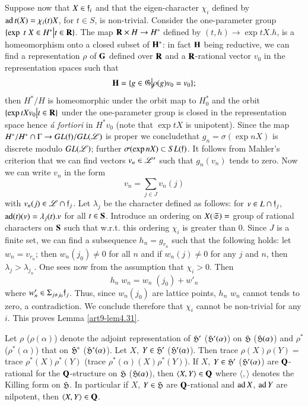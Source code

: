 \subsection{}\label{art9-subsec4.33}
Suppose now that $X \in \mathfrak{f}_i$ and that the eigen-character $\chi_i$ defined by $\operatorname{ad} t (X) = \chi_i(t) X$, for $t \in S$, is non-trivial. Consider the one-parameter group $\{\exp \; t\; X \in H^\ast \big| t \in \mathbf{R}\}$. The map $\mathbf{R} \times H \to H^\ast$ defined by $(t, h) \to \exp t X. h$, is a homeomorphism onto a closed subset of $\mathbf{H}^\ast$: in fact $\mathbf{H}$ being reductive, we can find a representation $\rho$ of $\mathbf{G}$ defined over $\mathbf{R}$ and a $\mathbf{R}$-rational vector $v_0$ in the representation spaces such that 
$$
\mathbf{H} = \{g \in \mathfrak{G} \big| \rho (g) v_0 = v_0\};
$$
then $H^\ast/ H$ is homeomorphic under the orbit map to $H^\ast_0$ and the orbit $\{\exp t X v_0 \big| t \in \mathbf{R}\}$ under the one-parameter group is closed in the representation space hence \textit{\'a fortiori} in $H^\ast v_0$  (note that $\exp t X$ is unipotent). Since the map $H^\ast/H^\ast \cap \Gamma \to G L (\mathfrak{f})/ GL (\mathscr{L})$ is proper we conclude\pageoriginale that $g_n = \sigma (\exp n X)$ is discrete modulo $GL(\mathscr{L})$; further $\sigma (\exp n X) \subset SL (\mathfrak{f})$. It follows from Mahler's criterion that we can find vectors $v_n \in \mathscr{L}'$ such that $g_n (v_n)$ tends to zero. Now we can write $v_n$ in the form
$$
v_n = \sum\limits_{j \in J} v_n (j)
$$
with $v_n(j) \in \mathscr{L} \cap \mathfrak{f}_j$. Let $\lambda_j$ be the character defined as follows: for $v \in L \cap \mathfrak{f}_j$, $\operatorname{ad} (t) (v) = \lambda_j (t).v$ for all $t \in \mathbf{S}$. Introduce an ordering on $X (\mathfrak{S}) =$ group of rational characters on $\mathbf{S}$ such that w.r.t. this ordering $\chi_i$ is greater than 0. Since $J$ is a finite set, we can find a subsequence $h_n = g_{r_n}$ such that the following holds: let $w_n = v_{r_n}$; then $w_n (j_0) \neq 0 $ for all $n$ and if $w_n (j)\neq 0$ for any $j$ and $n$, then $\lambda_j > \lambda_{j_n}$. One sees now from the assumption that $\chi_i >0$. Then 
$$
h_n \;w_n = w_n \;(j_0) + w'_n
$$
where $w'_n \in \Sigma_{j \neq j_0} \mathfrak{f}_j$. Thus, since $w_n (j_0)$ are lattice points, $h_n$ $w_n$ cannot tends to zero, a contradiction. We conclude therefore that $\chi_i$ cannot be non-trivial for any $i$. This proves Lemma \ref{art9-lem4.31}.

\begin{coro}\label{art9-coro4.34}
Let $\rho$ (\resp $\rho (\alpha)$) denote the adjoint representation of $\mathfrak{H}'$ (\resp $\mathfrak{H}' (\alpha)$) on $\mathfrak{H}$ (\resp $\mathfrak{H}(\alpha)$) and $\rho^\ast$ (\resp $\rho^\ast (\alpha)$) that on $\mathfrak{H}^\ast$ (\resp $\mathfrak{H}^\ast(\alpha)$). Let $X$, $Y \in \mathfrak{H}'$ (\resp $\mathfrak{H}'(\alpha)$). Then trace $\rho (X) \rho (Y)=$ trace $\rho^\ast (X) \rho^\ast (Y)$ (\resp trace $\rho^\ast (\alpha) (X) \rho^\ast (Y)$). If $X$, $Y \in \mathfrak{H}'$ (\resp $\mathfrak{H}'(\alpha)$) are $\mathbf{Q}$-rational for the $\mathbf{Q}$-structure on $\mathfrak{H}$ (\resp $\mathfrak{H} (\alpha)$), then $\langle X,Y \rangle \in \mathbf{Q}$ where $\langle ,\rangle$ denotes the Killing form on $\mathfrak{H}$. In particular if $X$, $Y \in\mathfrak{H}$ are $\mathbf{Q}$-rational and $\operatorname{ad} X$, $\operatorname{ad} Y$ are nilpotent, then $\langle X, Y \rangle \in\mathbf{Q}$.
\end{coro}

